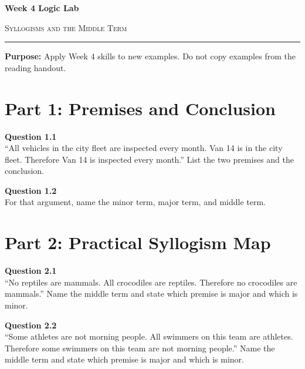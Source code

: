\documentclass[12pt]{article}
\begin{document}
\begin{center}
{\LARGE\bfseries Week 4 Logic Lab}\par\vspace{0.05em}
{\large\scshape Syllogisms and the Middle Term}\par\vspace{0.1em}
\rule{0.78\textwidth}{0.5pt}\par\vspace{0.15em}
\end{center}

\noindent\textbf{Purpose:} Apply Week 4 skills to new examples. Do not copy examples from the reading handout.

\vspace{0.3em}

\section*{Part 1: Premises and Conclusion}

\textbf{Question 1.1}\\[-0.15em]
``All vehicles in the city fleet are inspected every month. Van 14 is in the city fleet. Therefore Van 14 is inspected every month.'' List the two premises and the conclusion.


\textbf{Question 1.2}\\[-0.15em]
For that argument, name the minor term, major term, and middle term.


\newpage

\section*{Part 2: Practical Syllogism Map}

\textbf{Question 2.1}\\[-0.15em]
``No reptiles are mammals. All crocodiles are reptiles. Therefore no crocodiles are mammals.'' Name the middle term and state which premise is major and which is minor.


\textbf{Question 2.2}\\[-0.15em]
``Some athletes are not morning people. All swimmers on this team are athletes. Therefore some swimmers on this team are not morning people.'' Name the middle term and state which premise is major and which is minor.
\end{document}
